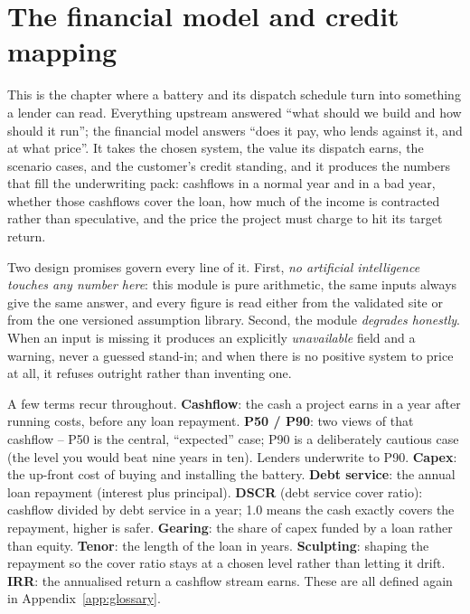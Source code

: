 \chapter{The financial model and credit mapping}
\label{ch:finance}

This is the chapter where a battery and its dispatch schedule turn into something a lender can read. Everything upstream answered ``what should we build and how should it run''; the financial model answers ``does it pay, who lends against it, and at what price''. It takes the chosen system, the value its dispatch earns, the scenario cases, and the customer's credit standing, and it produces the numbers that fill the underwriting pack: cashflows in a normal year and in a bad year, whether those cashflows cover the loan, how much of the income is contracted rather than speculative, and the price the project must charge to hit its target return.

Two design promises govern every line of it. First, \emph{no artificial intelligence touches any number here}: this module is pure arithmetic, the same inputs always give the same answer, and every figure is read either from the validated site or from the one versioned assumption library. Second, the module \emph{degrades honestly}. When an input is missing it produces an explicitly \emph{unavailable} field and a warning, never a guessed stand-in; and when there is no positive system to price at all, it refuses outright rather than inventing one.

\begin{plainnote}
A few terms recur throughout. \textbf{Cashflow}: the cash a project earns in a year after running costs, before any loan repayment. \textbf{P50 / P90}: two views of that cashflow -- P50 is the central, ``expected'' case; P90 is a deliberately cautious case (the level you would beat nine years in ten). Lenders underwrite to P90. \textbf{Capex}: the up-front cost of buying and installing the battery. \textbf{Debt service}: the annual loan repayment (interest plus principal). \textbf{DSCR} (debt service cover ratio): cashflow divided by debt service in a year; 1.0 means the cash exactly covers the repayment, higher is safer. \textbf{Gearing}: the share of capex funded by a loan rather than equity. \textbf{Tenor}: the length of the loan in years. \textbf{Sculpting}: shaping the repayment so the cover ratio stays at a chosen level rather than letting it drift. \textbf{IRR}: the annualised return a cashflow stream earns. These are all defined again in Appendix~\ref{app:glossary}.
\end{plainnote}

